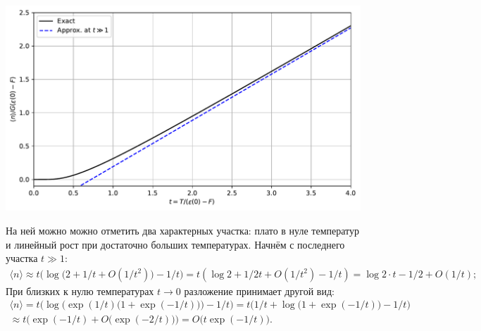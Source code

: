 \documentclass[a4paper, 14pt, russian]{article}
\begin{document}
        \begin{center}
            \includegraphics[width = \linewidth]{n_from_t.pdf}
        \end{center}
        На ней можно можно отметить два характерных участка:
        плато в нуле температур и линейный рост при достаточно 
        больших температурах. Начнём с последнего участка $t \gg 1$:
        \begin{multline}
            \langle n \rangle \approx t \Big(\log\big(2 + 1 / t + O(1 / t^2)\big)
                - 1 / t \Big) = t (\log 2 + 1 / 2 t + O(1/ t^2) - 1 / t) =
                \log 2 \cdot  t - 1 / 2 + O(1 / t); 
        \end{multline}
        При близких к нулю температурах $t \rightarrow 0$ разложение принимает 
        другой вид:
        \begin{multline}
            \langle n \rangle = t \bigg(\log\Big(
                \exp(1/t)\big(1 + \exp(-1 / t)\big)\Big) - 1/ t\bigg)
                = t \bigg(1/t + \log\big(1 + \exp(-1 / t)\big)
                - 1 / t \bigg)\\
            \approx t \Big(\exp(-1 / t) + O\big(\exp(-2 / t)\big)\Big) = 
            O\big(t \exp(-1 / t) \big).
        \end{multline}
\end{document}
